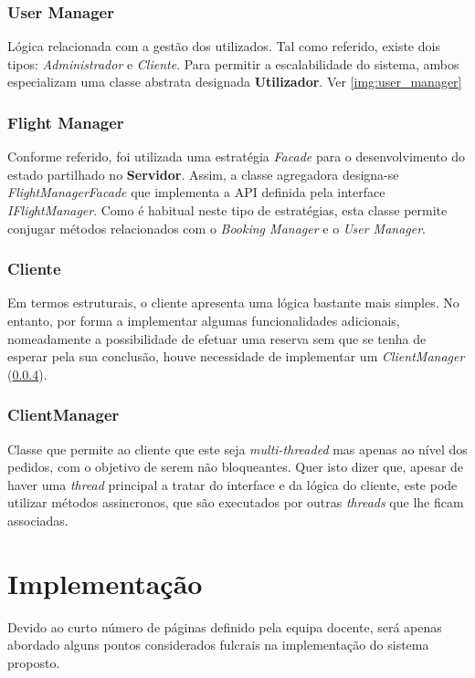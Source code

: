 \documentclass[a4paper,11pt]{article}
\begin{document}
\subsubsection{User Manager}
Lógica relacionada com a gestão dos utilizados. Tal como referido, existe dois tipos:
\textit{Administrador} e \textit{Cliente}.
Para permitir a escalabilidade do sistema, ambos especializam uma classe abstrata designada
\textbf{Utilizador}. Ver \ref{img:user_manager}

\subsubsection{Flight Manager}
Conforme referido, foi utilizada uma estratégia \textit{Facade} para o desenvolvimento
do estado partilhado no \textbf{Servidor}.
Assim, a classe agregadora designa-se \textit{FlightManagerFacade} que implementa a API definida
pela interface \textit{IFlightManager}.
Como é habitual neste tipo de estratégias, esta classe permite conjugar métodos relacionados com 
o \textit{Booking Manager} e o \textit{User Manager}.

\subsubsection{Cliente}
Em termos estruturais, o cliente apresenta uma lógica bastante mais simples.
No entanto, por forma a implementar algumas funcionalidades adicionais, nomeadamente
a possibilidade de efetuar uma reserva sem que se tenha de esperar pela sua conclusão,
houve necessidade de implementar um \textit{ClientManager} (\ref{sec:client_manager}).

\subsubsection{ClientManager} \label{sec:client_manager}
Classe que permite ao cliente que este seja \textit{multi-threaded} mas apenas ao nível dos pedidos,
com o objetivo de serem não bloqueantes.
Quer isto dizer que, apesar de haver uma \textit{thread} principal a tratar do interface
e da lógica do cliente, este pode utilizar métodos assincronos, que são executados por 
outras \textit{threads} que lhe ficam associadas.

\section{Implementação}
Devido ao curto número de páginas definido pela equipa docente, será apenas abordado alguns pontos
considerados fulcrais na implementação do sistema proposto.
\end{document}
